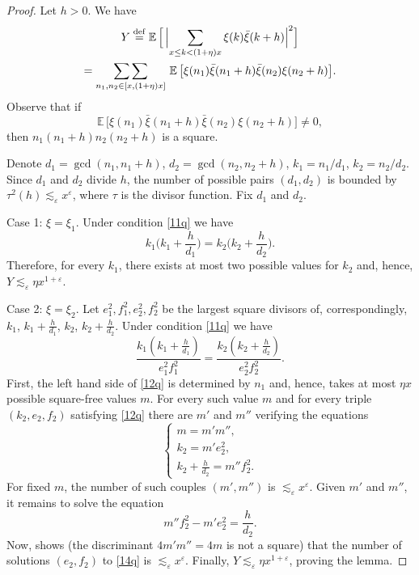 \documentclass[11pt]{amsart}
\numberwithin{equation}{section}
\DeclareMathOperator*{\sumsum}{\sum\sum}
\begin{document}
\begin{proof}Let $h > 0$.
We have
\begin{multline*}
Y \stackrel{\rm def}=
\mathbb E\,\Bigl[\, \Bigl|\sum_{x\le k< (1+\eta)x}\xi(k)\bar\xi(k+h)\Bigr|^2 \Bigr] \\
= \sumsum_{n_1,n_2\in[x,(1+\eta)x]}\,
\mathbb E\,\bigl[ \xi(n_1)\bar\xi(n_1+h)\bar\xi(n_2)\xi(n_2+h)\bigr].
\end{multline*}
Observe that if
\begin{equation}
\mathbb E\,\bigl[\xi(n_1)\bar\xi(n_1+h)\bar\xi(n_2)\xi(n_2+h)\bigr]\not=0,
\label{11q}
\end{equation}
then $n_1(n_1+h)n_2(n_2+h)$ is a square.

Denote $d_1=\gcd(n_1,n_1+h)$, $d_2=\gcd(n_2,n_2+h)$, $k_1=n_1/d_1$, $k_2=n_2/d_2$.
Since $d_1$ and $d_2$ divide $h$, the number of possible pairs
$(d_1,d_2)$ is bounded by $\tau^2(h)\lesssim_\varepsilon x^\varepsilon$, where $\tau$ is the
divisor function. Fix $d_1$ and $d_2$.

\medskip\noindent Case 1: $\xi=\xi_1$. Under condition \eqref{11q} we have
$$
k_1\Big(k_1+\frac{h}{d_1}\Big)=k_2\Big(k_2+\frac{h}{d_2}\Big).
$$
Therefore, for every $k_1$, there exists at most two possible values for $k_2$ and, hence,
$Y\lesssim_\varepsilon \eta x^{1+\varepsilon}$.

\medskip\noindent Case 2: $\xi=\xi_2$.
Let $e_1^2,f_1^2,e_2^2,f_2^2$ be the largest square divisors of, correspondingly,
$k_1$, $k_1+\frac{h}{d_1}$, $k_2$, $k_2+\frac{h}{d_2}$. Under condition \eqref{11q} we have
\begin{equation}
\frac{k_1(k_1+\frac{h}{d_1})}{e_1^2f_1^2}=\frac{k_2(k_2+\frac{h}{d_2})}{e_2^2f_2^2}.
\label{12q}
\end{equation}
First, the left hand side of \eqref{12q} is determined by $n_1$ and, hence, takes at most $\eta x$ possible square-free values $m$.
For every such value $m$ and for every triple $(k_2,e_2,f_2)$ satisfying \eqref{12q} there are $m'$ and $m''$ verifying the equations
$$
\begin{cases}
m=m'm'',\\
k_2=m'e_2^2,\\
k_2+\frac{h}{d_2}=m''f_2^2.
\end{cases}
$$
For fixed $m$, the number of such couples $(m',m'')$ is $\lesssim_\varepsilon x^\varepsilon$.
Given $m'$ and $m''$, it remains to solve the equation
\begin{equation}
m''f_2^2-m'e_2^2=\frac{h}{d_2}.
\label{14q}
\end{equation}
Now, \cite[Proposition 1]{CilGar} shows (the discriminant $4m'm''=4m$ is not a square) that the
number of solutions $(e_2,f_2)$ to \eqref{14q} is $\lesssim_\varepsilon x^\varepsilon$.
Finally, $Y\lesssim_\varepsilon \eta x^{1+\varepsilon}$, proving the lemma.
\end{proof}
\end{document}

